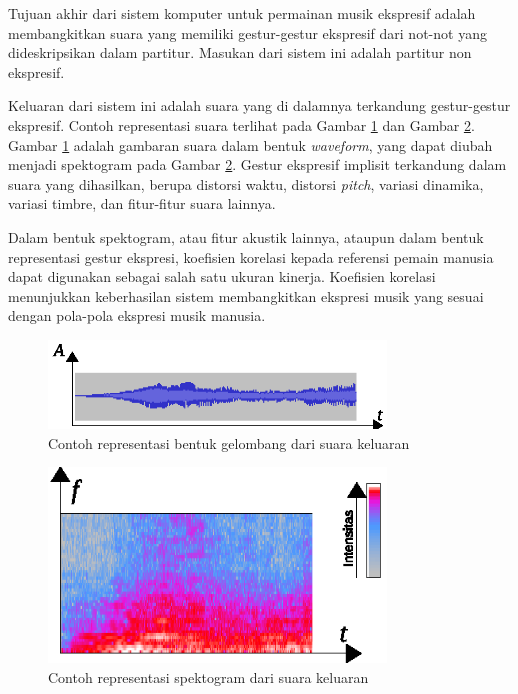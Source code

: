 Tujuan akhir dari sistem komputer untuk permainan musik ekspresif adalah membangkitkan suara yang memiliki gestur-gestur ekspresif dari not-not yang dideskripsikan dalam partitur. Masukan dari sistem ini adalah partitur non ekspresif.

Keluaran dari sistem ini adalah suara yang di dalamnya terkandung gestur-gestur ekspresif. Contoh representasi suara terlihat pada Gambar \ref{waveformexample} dan Gambar \ref{spectogramexample}. Gambar \ref{waveformexample} adalah gambaran suara dalam bentuk \textit{waveform}, yang dapat diubah menjadi spektogram pada Gambar \ref{spectogramexample}. Gestur ekspresif implisit terkandung dalam suara yang dihasilkan, berupa distorsi waktu, distorsi \textit{pitch}, variasi dinamika, variasi timbre, dan fitur-fitur suara lainnya.

Dalam bentuk spektogram, atau fitur akustik lainnya, ataupun dalam bentuk representasi gestur ekspresi, koefisien korelasi kepada referensi pemain manusia dapat digunakan sebagai salah satu ukuran kinerja. Koefisien korelasi menunjukkan keberhasilan sistem membangkitkan ekspresi musik yang sesuai dengan pola-pola ekspresi musik manusia. \parencite{schubert2017test} \parencite{lindemann2007rpm}

\begin{figure}[h]
    \centering
    \includegraphics[width=0.8\textwidth]{resources/waveform-example.eps}
    \caption{Contoh representasi bentuk gelombang dari suara keluaran} \label{waveformexample}
\end{figure}

\begin{figure}[h]
    \centering
    \includegraphics[width=0.8\textwidth]{resources/spectogram-example.eps}
    \caption{Contoh representasi spektogram dari suara keluaran} \label{spectogramexample}
\end{figure}

